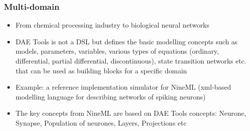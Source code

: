 \documentclass[compress,newPxFont,sthlmFooter]{beamer}
\begin{document}
\begin{frame}
\frametitle{Multi-domain}
\begin{block}{}
\begin{itemize}
  \item From chemical processing industry to biological neural networks
  \item DAE Tools is not a DSL but defines the basic modelling concepts such as models, parameters, variables, various types of equations 
        (ordinary, differential, partial differential, discontinuous), state transition networks etc. that can be used as building blocks 
        for a specific domain
  \item Example: a reference implementation simulator for NineML (xml-based modelling language for describing networks of spiking neurons)
  \item The key concepts from NineML are based on DAE Tools concepts: Neurone, Synapse, Population of neurones, Layers, Projections etc
\end{itemize}
\end{block}
\end{frame}
\end{document}
